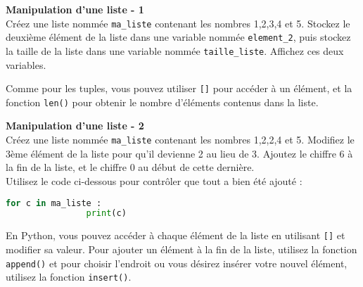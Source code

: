      \begin{Exercice}[5 minutes] \textbf{Manipulation d'une liste - 1}\\
        Créez une liste nommée \lstinline{ma_liste} contenant les nombres 1,2,3,4 et 5. Stockez le deuxième élément de la liste dans une variable nommée \lstinline{element_2}, puis stockez la taille de la liste dans une variable nommée \lstinline{taille_liste}. Affichez ces deux variables.\\
    
        \begin{conseil}
            Comme pour les tuples, vous pouvez utiliser \lstinline{[]} pour accéder à un élément, et la fonction \lstinline{len()} pour obtenir le nombre d'éléments contenus dans la liste.
        \end{conseil}
        
        \begin{solution}
             
        \end{solution}
    \end{Exercice}
    
    \begin{Exercice}[5 minutes] \textbf{Manipulation d'une liste - 2}\\
       Créez une liste nommée \lstinline{ma_liste} contenant les nombres 1,2,2,4 et 5. Modifiez le 3ème élément de la liste pour qu'il devienne 2 au lieu de 3. Ajoutez le chiffre 6 à la fin de la liste, et le chiffre 0 au début de cette dernière. \\
       
       Utilisez le code ci-dessous pour contrôler que tout a bien été ajouté : \\
       
       \begin{lstlisting}[language=Python]
            for c in ma_liste :
            	print(c)   \end{lstlisting}
    
        \begin{conseil}
            En Python, vous pouvez accéder à chaque élément de la liste en utilisant \lstinline{[]} et modifier sa valeur. Pour ajouter un élément à la fin de la liste, utilisez la fonction \lstinline{append()} et pour choisir l'endroit ou vous désirez insérer votre nouvel élément, utilisez la fonction \lstinline{insert()}.
        \end{conseil}
        
        \begin{solution}
             
        \end{solution}
    \end{Exercice}
    
